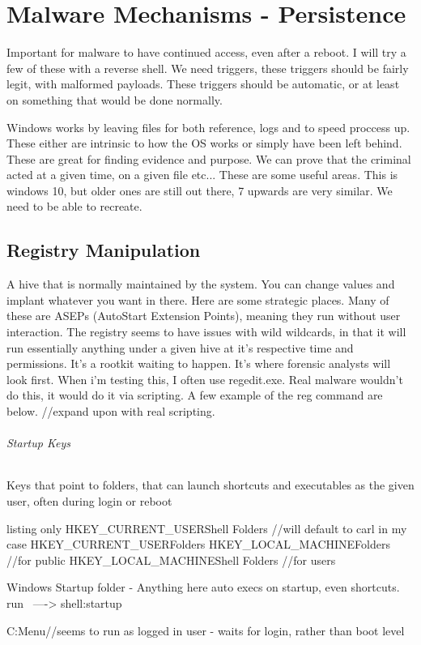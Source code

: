 

\chapter{Malware Mechanisms - Persistence}
Important for malware to have continued access, even after a reboot. I will try a few of these with a reverse shell. 
We need triggers, these triggers should be fairly legit, with malformed payloads. These triggers should be automatic, or at least on something that would be done normally.

Windows works by leaving files for both reference, logs and to speed proccess up. These either are intrinsic to how the OS works or simply have been left behind. 
These are great for finding evidence and purpose. We can prove that the criminal acted at a given time, on a given file etc... These are some useful areas. This is windows 10, but older ones are still out there, 7 upwards are very similar. We need to be able to recreate.

\section{Registry Manipulation}
A hive that is normally maintained by the system. You can change values and implant whatever you want in there. Here are some strategic places. 
Many of these are ASEPs (AutoStart Extension Points), meaning they run without user interaction. The registry seems to have issues with wild wildcards, 
in that it will run essentially anything under a given hive at it's respective time and permissions. It's a rootkit waiting to happen. 
It's where forensic analysts will look first. When i'm testing this, I often use regedit.exe. Real malware wouldn't do this, it would do it via scripting. 
A few example of the reg command are below. 
//expand upon with real scripting.


\subparagraph{Startup Keys}
Keys that point to folders, that can launch shortcuts and executables as the given user, often during login or reboot
\begin{tcblisting}{listing only}
HKEY_CURRENT_USER\Software\Microsoft\Windows\CurrentVersion\Explorer\User Shell Folders //will default to carl in my case
HKEY_CURRENT_USER\Software\Microsoft\Windows\CurrentVersion\Explorer\Shell Folders
HKEY_LOCAL_MACHINE\SOFTWARE\Microsoft\Windows\CurrentVersion\Explorer\Shell Folders //for public
HKEY_LOCAL_MACHINE\SOFTWARE\Microsoft\Windows\CurrentVersion\Explorer\User Shell Folders  //for users

Windows Startup folder - Anything here auto execs on startup, even shortcuts. run  ----> shell:startup

C:\Users\USERNAME\AppData\Roaming\Microsoft\Windows\Start Menu\Programs\Startup //seems to run as logged in user - waits for login, rather than boot level

\end{tcblisting}


